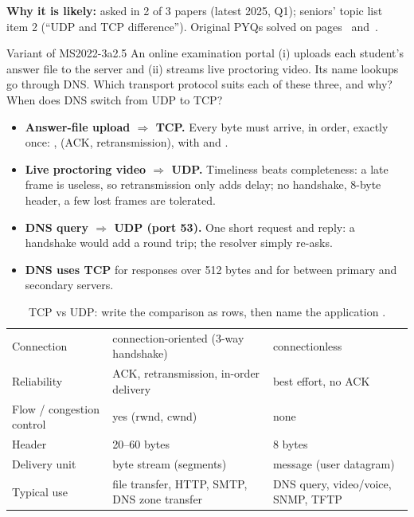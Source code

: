 \textbf{Why it is likely:} asked in 2 of 3 papers (latest 2025, Q1); seniors' topic list item 2 (``UDP and TCP difference''). Original PYQs solved on pages~\pageref{q:MS2025-1b} and~\pageref{q:MS2022-3a}.

\begin{question}{Variant of MS2022-3a}{2.5}
An online examination portal (i) uploads each student's answer file to the server and (ii) streams live proctoring video. Its name lookups go through DNS. Which transport protocol suits each of these three, and why? When does DNS switch from UDP to TCP?
\end{question}
\begin{solution}
\begin{itemize}
\item \textbf{Answer-file upload $\Rightarrow$ TCP.} Every byte must arrive, in order, exactly once: ,  (ACK, retransmission), with  and .
\item \textbf{Live proctoring video $\Rightarrow$ UDP.} Timeliness beats completeness: a late frame is useless, so retransmission only adds delay; no handshake, 8-byte header, a few lost frames are tolerated.
\item \textbf{DNS query $\Rightarrow$ UDP (port 53).} One short request and reply: a handshake would add a round trip; the resolver simply re-asks.
\item \textbf{DNS uses TCP} for responses over 512 bytes and for  between primary and secondary servers.
\end{itemize}
\end{solution}

\begin{table}[H]\centering\small\zebra
\begin{tabularx}{\linewidth}{L{30mm}YY}\toprule
{} &  & \\\midrule
Connection & connection-oriented (3-way handshake) & connectionless\\
Reliability & ACK, retransmission, in-order delivery & best effort, no ACK\\
Flow / congestion control & yes (rwnd, cwnd) & none\\
Header & 20--60 bytes & 8 bytes\\
Delivery unit & byte stream (segments) & message (user datagram)\\
Typical use & file transfer, HTTP, SMTP, DNS zone transfer & DNS query, video/voice, SNMP, TFTP\\\bottomrule
\end{tabularx}
\caption{TCP vs UDP: write the comparison as rows, then name the application .}\end{table}

